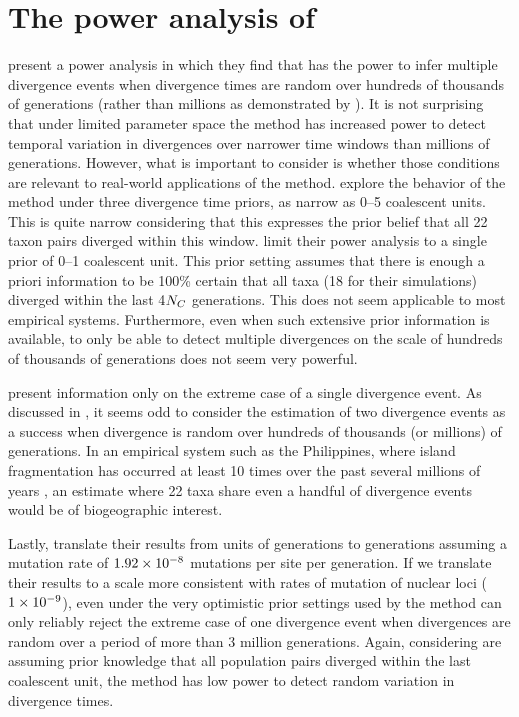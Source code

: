 \section*{The power analysis of \citet{Hickerson2013}}
\citet{Hickerson2013} present a power analysis in which they find that
\msb has the power to infer multiple divergence events when divergence times
are random over hundreds of thousands of generations (rather than millions as
demonstrated by \citet{Oaks2012}).
It is not surprising that under limited parameter space the method has
increased power to detect temporal variation in divergences over narrower time
windows than millions of generations.
However, what is important to consider is whether those conditions are relevant
to real-world applications of the method.
\citet{Oaks2012} explore the behavior of the method under three divergence time
priors, as narrow as 0--5 coalescent units. This is quite narrow considering
that this expresses the prior belief that all 22 taxon pairs diverged within
this window.
\citet{Hickerson2013} limit their power analysis to a single prior of 0--1
coalescent unit.
This prior setting assumes that there is enough a priori information to
be 100\% certain that all taxa (18 for their simulations) diverged within
the last 4$N_C$ generations.
This does not seem applicable to most empirical systems.
Furthermore, even when such extensive prior information is available, to only
be able to detect multiple divergences on the scale of hundreds of thousands of
generations does not seem very powerful.

\citet{Hickerson2013} present information only on the extreme case of a
single divergence event.
As discussed in \citet{Oaks2012}, it seems odd to consider the estimation
of two divergence events as a success when divergence is random over hundreds
of thousands (or millions) of generations.
In an empirical system such as the Philippines, where island fragmentation has
occurred at least 10 times over the past several millions of years
\citep{Haq1987,Rohling1998,Siddall2003,Miller2005}, an estimate where 22 taxa
share even a handful of divergence events would be of biogeographic interest.

Lastly, \citet{Hickerson2013} translate their results from units of
\globalcoalunit generations to generations assuming a mutation rate of
$1.92\times 10^{-8}$ mutations per site per generation.
If we translate their results to a scale more consistent with rates of mutation
of nuclear loci ($1\times 10^{-9}$), even under the very optimistic prior settings used
by \citet{Hickerson2013} the method can only reliably reject the extreme case
of one divergence event when divergences are random over a period of more than
3 million generations.
Again, considering \citet{Hickerson2013} are assuming prior knowledge that
all population pairs diverged within the last coalescent unit, the
method has low power to detect random variation in divergence times.




